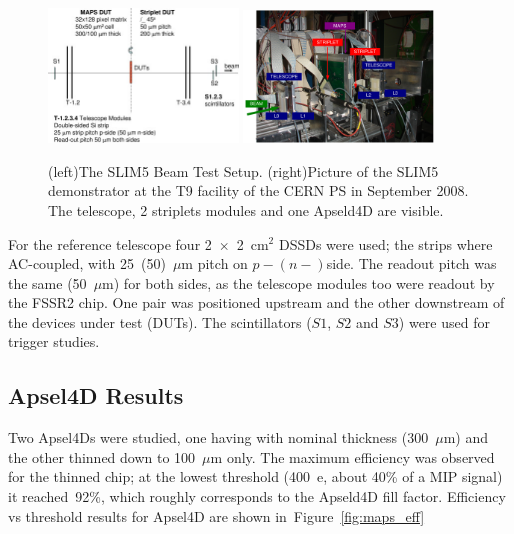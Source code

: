 \begin{figure}[!htpb]
\centering
\includegraphics[width=0.45\textwidth]{slim5_tb.jpg}
\includegraphics[width=0.45\textwidth]{tbpic.pdf}
\caption{\label{fig:slim5_tb}(left)The SLIM5 Beam Test Setup. (right)Picture of the SLIM5 demonstrator at the T9 facility of the CERN PS in September 2008. The telescope, 2 striplets modules and 
one Apseld4D are visible.}
\end{figure}



For the reference telescope four 2~$\times$~2~cm$^{2}$ DSSDs were used; 
the strips where AC-coupled, with 25~(50)~$\mu$m pitch on $p-(n-)$side. The readout pitch 
was the same (50~$\mu$m) for both sides, as the telescope modules too were readout by 
the FSSR2 chip. One pair was positioned upstream and the other downstream of the devices 
under test (DUTs). The scintillators ($S1$, $S2$ and $S3$) were used for trigger studies.

\subsection{Apsel4D Results}
Two Apsel4Ds were studied, one having with nominal thickness (300~$\mu$m) and the other 
thinned down to 100~$\mu$m only. The maximum efficiency was observed for the 
thinned chip; at the lowest threshold (400~e, about 40\% of a MIP signal) it reached~92\%, which roughly corresponds to 
the Apseld4D fill factor. 
Efficiency vs threshold results for Apsel4D are shown in~Figure~\ref{fig:maps_eff}

